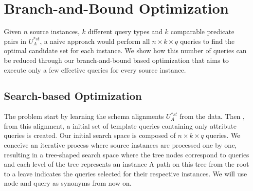 \section{Branch-and-Bound Optimization}


Given $n$ source instances, $k$ different query types and $k$ comparable predicate pairs in $U^{*st}_A$, a naive approach would perform all $n \times k \times q$ queries to find the optimal candidate set for each instance. We show how this number of queries can be reduced through our branch-and-bound based optimization that aims to execute only a few effective queries for every source instance. 
 
\subsection{Search-based Optimization} 
The problem start by learning the schema alignments $U^{*st}_A$ from the data. Then , from this alignment, a initial set of template queries containing only attribute queries is created. Our initial search space is composed of $n \times k \times q$ queries. We conceive an iterative process where source instances are processed one by one, resulting in a tree-shaped search space where the tree nodes correspond to queries and each level of the tree represents an instance  A path on this tree from the root to a leave indicates the queries selected for their respective instances. We will use node and query as synonyms from now on.

